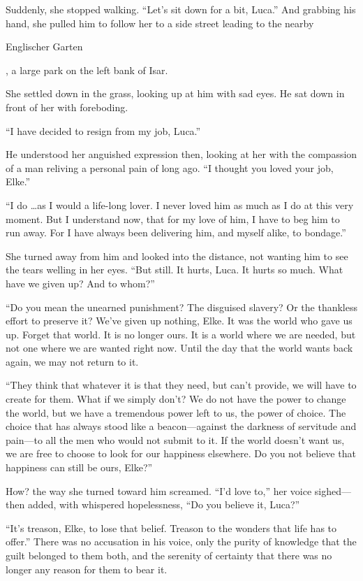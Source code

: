 Suddenly, she stopped walking. ``Let's sit down for a bit, Luca.'' And grabbing his hand, she pulled him to follow her to a side street leading to the nearby \begin{otherlanguage}{ngerman}Englischer Garten\end{otherlanguage}, a large park on the left bank of Isar.

She settled down in the grass, looking up at him with sad eyes. He sat down in front of her with foreboding.

``I have decided to resign from my job, Luca.''

He understood her anguished expression then, looking at her with the compassion of a man reliving a personal pain of long ago. ``I thought you loved your job, Elke.''

``I do \ldots as I would a life-long lover. I never loved him as much as I do at this very moment. But I understand now, that for my love of him, I have to beg him to run away. For I have always been delivering him, and myself alike, to bondage.''

She turned away from him and looked into the distance, not wanting him to see the tears welling in her eyes. ``But still. It hurts, Luca. It hurts so much. What have we given up? And to whom?''

``Do you mean the unearned punishment? The disguised slavery? Or the thankless effort to preserve it? We've given up nothing, Elke. It was the world who gave us up. Forget that world. It is no longer ours. It is a world where we are needed, but not one where we are wanted right now. Until the day that the world wants back again, we may not return to it.

``They think that whatever it is that they need, but can't provide, we will have to create for them. What if we simply don't? We do not have the power to change the world, but we have a tremendous power left to us, the power of choice. The choice that has always stood like a beacon---against the darkness of servitude and pain---to all the men who would not submit to it. If the world doesn't want us, we are free to choose to look for our happiness elsewhere. Do you not believe that happiness can still be ours, Elke?''

How? the way she turned toward him screamed. ``I'd love to,'' her voice sighed---then added, with whispered hopelessness, ``Do you believe it, Luca?''

``It's treason, Elke, to lose that belief. Treason to the wonders that life has to offer.'' There was no accusation in his voice, only the purity of knowledge that the guilt belonged to them both, and the serenity of certainty that there was no longer any reason for them to bear it.

